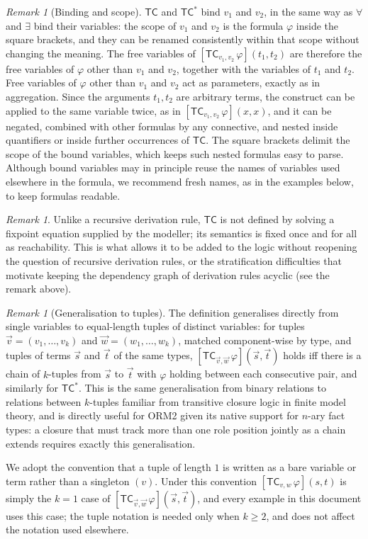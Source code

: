 \documentclass[11pt]{amsart}
\theoremstyle{definition}
\theoremstyle{remark}
\newtheorem{remark}[theorem]{Remark}
\newcommand{\TC}{\mathsf{TC}}
\begin{document}
\begin{remark}[Binding and scope]
$\TC$ and $\TC^{*}$ bind $v_1$ and $v_2$, in the same way as $\forall$ and
$\exists$ bind their variables: the scope of $v_1$ and $v_2$ is the formula
$\varphi$ inside the square brackets, and they can be renamed consistently
within that scope without changing the meaning. The free variables of
$[\TC_{v_1, v_2}\, \varphi](t_1, t_2)$ are therefore the free variables of
$\varphi$ other than $v_1$ and $v_2$, together with the variables of $t_1$
and $t_2$. Free variables of $\varphi$ other than $v_1$ and $v_2$ act as
parameters, exactly as in aggregation. Since the arguments $t_1, t_2$ are
arbitrary terms, the construct can be applied to the same variable twice,
as in $[\TC_{v_1, v_2}\, \varphi](x, x)$, and it can be negated, combined
with other formulas by any connective, and nested inside quantifiers or
inside further occurrences of $\TC$. The square brackets delimit the scope
of the bound variables, which keeps such nested formulas easy to parse.
Although bound variables may in principle reuse the names of variables
used elsewhere in the formula, we recommend fresh names, as in the
examples below, to keep formulas readable.
\end{remark}

\begin{remark}
Unlike a recursive derivation rule, $\TC$ is not defined by
solving a fixpoint equation supplied by the modeller; its semantics is
fixed once and for all as reachability. This is what allows it to be
added to the logic without reopening the question of recursive derivation
rules, or the stratification difficulties that motivate keeping the
dependency graph of derivation rules acyclic (see the remark above).
\end{remark}

\begin{remark}[Generalisation to tuples]
The definition generalises directly from single variables to equal-length
tuples of distinct variables: for tuples $\vec{v} = (v_1,\ldots,v_k)$ and
$\vec{w} = (w_1,\ldots,w_k)$, matched component-wise by type, and tuples of
terms $\vec{s}$ and $\vec{t}$ of the same types,
$[\TC_{\vec{v}, \vec{w}}\, \varphi](\vec{s}, \vec{t})$ holds iff there is a
chain of $k$-tuples from $\vec{s}$ to $\vec{t}$ with $\varphi$ holding
between each consecutive pair, and similarly for $\TC^{*}$. This is the
same generalisation from binary relations to relations between $k$-tuples
familiar from transitive closure logic in finite model theory, and is
directly useful for ORM2 given its native support for $n$-ary fact types:
a closure that must track more than one role position jointly as a chain
extends requires exactly this generalisation.

We adopt the convention that a tuple of length $1$ is written as a bare
variable or term rather than a singleton $(v)$. Under this convention
$[\TC_{v, w}\, \varphi](s, t)$ is simply the $k=1$ case of
$[\TC_{\vec{v}, \vec{w}}\, \varphi](\vec{s}, \vec{t})$, and every example in
this document uses this case; the tuple notation is needed only when
$k \geq 2$, and does not affect the notation used elsewhere.
\end{remark}
\end{document}
